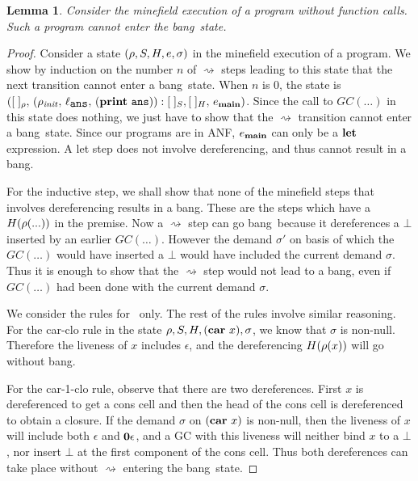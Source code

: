 \documentclass[9pt,preprint,letter,nonatbib]{sigplanconf}
\newcommand{\bang}{\mbox{\sc bang}}
\newtheorem{lemma}[theorem]{Lemma}
\begin{document}
\begin{lemma}
\label{lemma:call-less-cannot-go-bang}
Consider the minefield execution of  a program without function calls.
Such a program cannot enter the \bang\ state.
\end{lemma}
\begin{proof}
Consider a  state  $(\rho,  S,  H,  e, \sigma)$  in  the
minefield execution of a program.  We  show by induction on the number $n$
of $\rightsquigarrow$ steps  leading to  this state  that the next  transition cannot
enter a  \bang\ state.   When $n$  is 0,  the state  is $([\;]_\rho,\,
(\rho_\mathit{init},   \,  \ell_{\mathbf{\mbox{\tt ans}}}   ,\,  (\mathbf{print}~\mathbf{\mbox{\tt ans}})):[\;]_{S},
[\;]_{H},\, e_{\mathbf{main}})$.   Since the call  to $GC(\ldots)$ in  this state
does  nothing,  we  just  have to  show  that  the  $\rightsquigarrow$
transition cannot  enter a  \bang\ state.  Since  our programs  are in
ANF, $e_{\mathbf{main}}$ can only be a $\mbox{$\mathbf{ let}$}$ expression.  A {\sc let} step
does not involve dereferencing, and thus cannot result in a \bang.

For the inductive step, we shall show that none of the minefield steps
that involves dereferencing  results in a \bang.  These  are the steps
which   have   a   $H(\rho(...))$   in   the   premise.    Now   a
$\rightsquigarrow$ step can go \bang\ because it dereferences a $\bot$
inserted by an earlier $GC(\ldots)$.   However the demand $\sigma'$  on basis of
which the $GC(\ldots)$ would have inserted a  $\bot$ would have
included the  current demand $\sigma$.     Thus it is
enough to  show that the $\rightsquigarrow$ step would not lead to a
\bang, even if $GC(\ldots)$ had been done with the current demand
$\sigma$.

We consider the rules for \CAR\  only.  
The rest  of the rules involve similar reasoning. For the {\sc
  car-clo}  rule in  the state  $\rho, S,  H, (\mbox{$\mathbf{car}$}~x),
\sigma$, we  know that $\sigma$ is  non-null. Therefore
the  liveness  of  $x$  includes  $\epsilon$,  and  the
dereferencing $H(\rho(x))$ will go without \bang.

For the  {\sc car-1-clo}  rule, observe that  there are
two dereferences.  First $x$  is dereferenced to  get a
cons  cell  and then  the  head  of  the cons  cell  is
dereferenced  to  obtain  a  closure.   If  the  demand
$\sigma$ on  $(\mbox{$\mathbf{car}$}~x)$ is non-null, then  the liveness
of    $x$   will    include    both   $\epsilon$    and
$\mathbf{0}\epsilon$,  and  a  GC with  this  liveness  will
neither bind $x$ to a  $\bot$, nor insert $\bot$ at the
first   component  of   the   cons   cell.  Thus   both
dereferences    can take place without 
$\rightsquigarrow$ entering the   \bang\ state.
\end{proof} 
\end{document}
